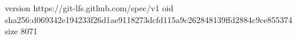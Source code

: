 version https://git-lfs.github.com/spec/v1
oid sha256:d069342e194233f26d1ae9118273dcfd115a9c262848139ffd2884c9ce855374
size 8071
